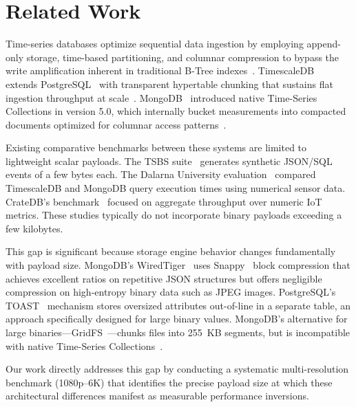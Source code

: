\documentclass[conference, a4paper]{IEEEtran}
\begin{document}
\section{Related Work}
\label{sec:related_work}

Time-series databases optimize sequential data ingestion by employing append-only storage, time-based partitioning, and columnar compression to bypass the write amplification inherent in traditional B-Tree indexes~\cite{dewaal_timeseries_survey,jensen_tsms_survey}. TimescaleDB~\cite{timescaledb_official} extends PostgreSQL~\cite{postgresql_official} with transparent hypertable chunking that sustains flat ingestion throughput at scale~\cite{dewaal_timeseries_survey,nerc_tsdb_survey}. MongoDB~\cite{mongodb_official} introduced native Time-Series Collections in version 5.0, which internally bucket measurements into compacted documents optimized for columnar access patterns~\cite{tigerdata_mongodb_timescaledb,maddevs_timescaledb_beats_pg}.

Existing comparative benchmarks between these systems are limited to lightweight scalar payloads. The TSBS suite~\cite{tsbs} generates synthetic JSON/SQL events of a few bytes each. The Dalarna University evaluation~\cite{diva_timescaledb_mongodb_eval} compared TimescaleDB and MongoDB query execution times using numerical sensor data. CrateDB's benchmark~\cite{cratedb_ts_benchmark} focused on aggregate throughput over numeric IoT metrics. These studies typically do not incorporate binary payloads exceeding a few kilobytes.

This gap is significant because storage engine behavior changes fundamentally with payload size. MongoDB's WiredTiger~\cite{mongodb_wiredtiger_storage} uses Snappy~\cite{google_snappy} block compression that achieves excellent ratios on repetitive JSON structures but offers negligible compression on high-entropy binary data such as JPEG images. PostgreSQL's TOAST~\cite{postgresql_toast_docs} mechanism stores oversized attributes out-of-line in a separate table, an approach specifically designed for large binary values. MongoDB's alternative for large binaries---GridFS~\cite{mongodb_gridfs}---chunks files into 255~KB segments, but is incompatible with native Time-Series Collections~\cite{mongodb_ts_limitations}.

Our work directly addresses this gap by conducting a systematic multi-resolution benchmark (1080p--6K) that identifies the precise payload size at which these architectural differences manifest as measurable performance inversions.
\end{document}
